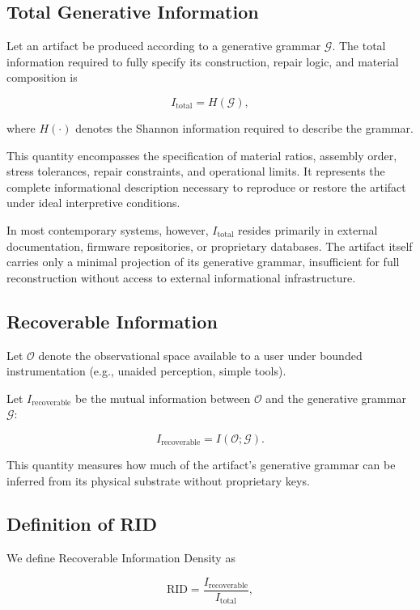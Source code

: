 \documentclass[11pt]{article}
\begin{document}
\subsection{Total Generative Information}

Let an artifact be produced according to a generative grammar
$\mathcal{G}$. The total information required to fully specify its
construction, repair logic, and material composition is

\[
I_{\text{total}} = H(\mathcal{G}),
\]

where $H(\cdot)$ denotes the Shannon information required to describe
the grammar.

This quantity encompasses the specification of material ratios,
assembly order, stress tolerances, repair constraints, and operational
limits. It represents the complete informational description necessary
to reproduce or restore the artifact under ideal interpretive
conditions.

In most contemporary systems, however, $I_{\text{total}}$ resides
primarily in external documentation, firmware repositories, or
proprietary databases. The artifact itself carries only a minimal
projection of its generative grammar, insufficient for full
reconstruction without access to external informational infrastructure.

\subsection{Recoverable Information}

Let $\mathcal{O}$ denote the observational space available to a user 
under bounded instrumentation (e.g., unaided perception, simple tools).

Let $I_{\text{recoverable}}$ be the mutual information between 
$\mathcal{O}$ and the generative grammar $\mathcal{G}$:

\[
I_{\text{recoverable}} = I(\mathcal{O}; \mathcal{G}).
\]

This quantity measures how much of the artifact's generative grammar 
can be inferred from its physical substrate without proprietary keys.

\subsection{Definition of RID}

We define Recoverable Information Density as

\[
\text{RID} = \frac{I_{\text{recoverable}}}{I_{\text{total}}},
\]
\end{document}
